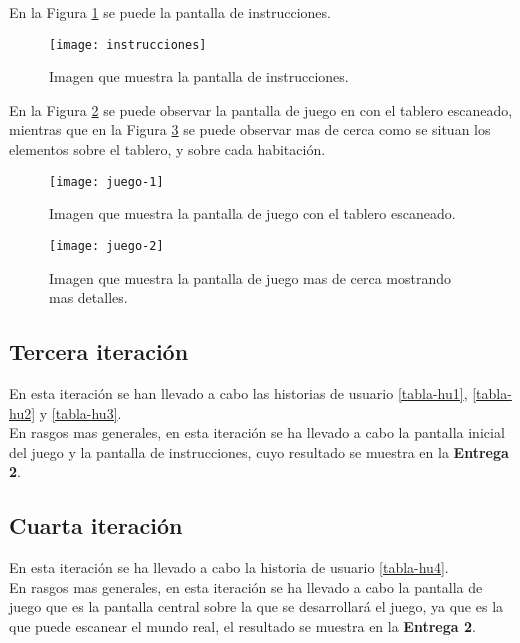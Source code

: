 \begin{itemize}
\newpage

En la Figura \ref{figura-instrucciones} se puede la pantalla de instrucciones.

\begin{figure}[h]
  \centering
  \texttt{[image: instrucciones]}
  \caption{Imagen que muestra la pantalla de instrucciones.}
  \label{figura-instrucciones}
\end{figure}


En la Figura \ref{figura-juego-1} se puede observar la pantalla de juego en con el tablero escaneado, mientras que en la Figura \ref{figura-juego-2} se puede observar mas de cerca como se situan los elementos sobre el tablero, y sobre cada habitación.

\begin{figure}[h]
  \centering
  \texttt{[image: juego-1]}
  \caption{Imagen que muestra la pantalla de juego con el tablero escaneado.}
  \label{figura-juego-1}
\end{figure}

\begin{figure}[h]
  \centering
  \texttt{[image: juego-2]}
  \caption{Imagen que muestra la pantalla de juego mas de cerca mostrando mas detalles.}
  \label{figura-juego-2}
\end{figure}

\FloatBarrier


\subsection{Tercera iteración}
En esta iteración se han llevado a cabo las historias de usuario \ref{tabla-hu1}, \ref{tabla-hu2} y \ref{tabla-hu3}.\\

En rasgos mas generales, en esta iteración se ha llevado a cabo la pantalla inicial del juego y la pantalla de instrucciones, cuyo resultado se muestra en la \textbf{Entrega 2}.


\subsection{Cuarta iteración}
En esta iteración se ha llevado a cabo la historia de usuario \ref{tabla-hu4}.\\

En rasgos mas generales, en esta iteración se ha llevado a cabo la pantalla de juego que es la pantalla central sobre la que se desarrollará el juego, ya que es la que puede escanear el mundo real, el resultado se muestra en la \textbf{Entrega 2}.\\


\end{itemize}
